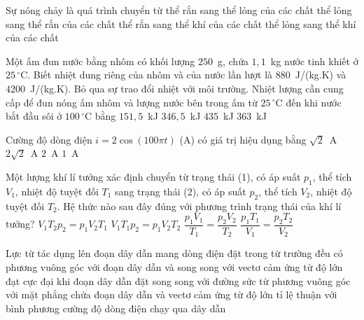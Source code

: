	\begin{ex}%
		Sự nóng chảy là quá trình chuyển từ
		\choice
		{\True thể rắn sang thể lỏng của các chất}
		{thể lỏng sang thể rắn của các chất}
		{thể rắn sang thể khí của các chất}
		{thể lỏng sang thể khí của các chất}
	\end{ex}

	\begin{ex}%
		Một ấm đun nước bằng nhôm có khối lượng $250$~g, chứa $1{,}1$~kg nước tinh khiết ở $25\,^\circ\text{C}$. Biết nhiệt dung riêng của nhôm và của nước lần lượt là $880$~J/(kg.K) và $4200$~J/(kg.K). Bỏ qua sự trao đổi nhiệt với môi trường. Nhiệt lượng cần cung cấp để đun nóng ấm nhôm và lượng nước bên trong ấm từ $25\,^\circ\text{C}$ đến khi nước bắt đầu sôi ở $100\,^\circ\text{C}$ bằng
		\choice
		{$151{,}5$~kJ}
		{$346{,}5$~kJ}
		{$435$~kJ}
		{\True $363$~kJ}
	\end{ex}

	\begin{ex}%
		Cường độ dòng điện $i=2\cos(100\pi t)$ (A) có giá trị hiệu dụng bằng
		\choice
		{\True $\sqrt{2}$~A}
		{$2\sqrt{2}$~A}
		{$2$~A}
		{$1$~A}
	\end{ex}

	\begin{ex}%
		Một lượng khí lí tưởng xác định chuyển từ trạng thái (1), có áp suất $p_1$, thể tích $V_1$, nhiệt độ tuyệt đối $T_1$ sang trạng thái (2), có áp suất $p_2$, thể tích $V_2$, nhiệt độ tuyệt đối $T_2$. Hệ thức nào sau đây đúng với phương trình trạng thái của khí lí tưởng?
		\choice
		{$V_1T_2p_2=p_1V_2T_1$}
		{$V_1T_1p_2=p_1V_2T_2$}
		{\True $\dfrac{p_1V_1}{T_1}=\dfrac{p_2V_2}{T_2}$}
		{$\dfrac{p_1T_1}{V_1}=\dfrac{p_2T_2}{V_2}$}
	\end{ex}

	\begin{ex}%
		Lực từ tác dụng lên đoạn dây dẫn mang dòng điện đặt trong từ trường đều có
		\choice
		{phương vuông góc với đoạn dây dẫn và song song với vectơ cảm ứng từ}
		{độ lớn đạt cực đại khi đoạn dây dẫn đặt song song với đường sức từ}
		{\True phương vuông góc với mặt phẳng chứa đoạn dây dẫn và vectơ cảm ứng từ}
		{độ lớn tỉ lệ thuận với bình phương cường độ dòng điện chạy qua dây dẫn}
	\end{ex}

